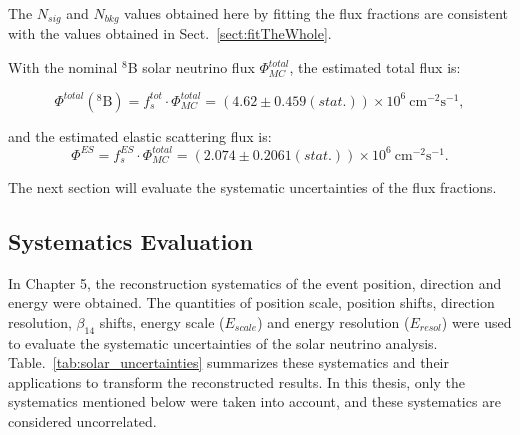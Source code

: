 The $N_{sig}$ and $N_{bkg}$ values obtained here by fitting the flux fractions are consistent with the values obtained in Sect.~\ref{sect:fitTheWhole}.

With the nominal $^8$B solar neutrino flux $\Phi^{total}_{MC}$, the estimated total flux is:

\begin{equation}
\Phi^{total}(\mathrm{^8 B})=f^{tot}_s\cdot \Phi^{total}_{MC}=(4.62 \pm 0.459(stat.))\times 10^6~\mathrm{cm^{-2}s^{-1}},
\end{equation}

and the estimated elastic scattering flux is:
\begin{equation}
\Phi^{ES}=f^{ES}_s\cdot \Phi^{total}_{MC}=(2.074\pm 0.2061(stat.))\times 10^6~\mathrm{cm^{-2}s^{-1}}.
\end{equation}

The next section will evaluate the systematic uncertainties of the flux fractions.

\subsection{Systematics Evaluation}
In Chapter 5, the reconstruction systematics of the event position, direction and energy were obtained. The quantities of position scale, position shifts, direction resolution, $\beta_{14}$ shifts, energy scale ($E_{scale}$) and energy resolution ($E_{resol}$) were used to evaluate the systematic uncertainties of the solar neutrino analysis. Table.~\ref{tab:solar_uncertainties} summarizes these systematics and their applications to transform the reconstructed results. In this thesis, only the systematics mentioned below were taken into account, and these systematics are considered uncorrelated. 

